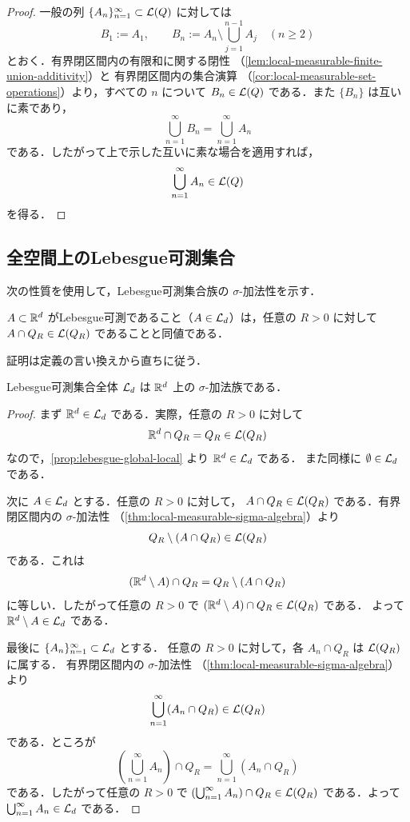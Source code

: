 \begin{proof}
一般の列 $\{A_n\}_{n=1}^{\infty}\subset\mathcal L(Q)$ に対しては
\[
B_1:=A_1,\qquad
B_n:=A_n\setminus\bigcup_{j=1}^{n-1}A_j
\quad(n\ge2)
\]
とおく．有界閉区間内の有限和に関する閉性
（\cref{lem:local-measurable-finite-union-additivity}）と
有界閉区間内の集合演算
（\cref{cor:local-measurable-set-operations}）より，すべての $n$ について
$B_n\in\mathcal L(Q)$ である．また $\{B_n\}$ は互いに素であり，
\[
\bigcup_{n=1}^{\infty}B_n=\bigcup_{n=1}^{\infty}A_n
\]
である．したがって上で示した互いに素な場合を適用すれば，
\[
\bigcup_{n=1}^{\infty}A_n\in\mathcal L(Q)
\]
を得る．
\end{proof}

\subsection{全空間上のLebesgue可測集合}

次の性質を使用して，Lebesgue可測集合族の $\sigma$-加法性を示す．
\begin{proposition} \label{prop:lebesgue-global-local}
$A\subset\mathbb R^d$ がLebesgue可測であること（$A \in \mathcal L_d$）は，任意の $R>0$ に対して $A\cap Q_R\in\mathcal L(Q_R)$ であることと同値である．    
\end{proposition}
証明は定義の言い換えから直ちに従う．

\begin{theorem}\label{thm:lebesgue-measurable-sigma-algebra}
Lebesgue可測集合全体 $\mathcal L_d$ は $\mathbb R^d$ 上の $\sigma$-加法族である．
\end{theorem}
\begin{proof}
まず $\mathbb R^d\in\mathcal L_d$ である．実際，任意の $R>0$ に対して
\[
\mathbb R^d\cap Q_R=Q_R \in \mathcal L(Q_R)
\]
なので，\cref{prop:lebesgue-global-local} より $\mathbb R^d \in \mathcal L_d$ である．
また同様に $\emptyset\in\mathcal L_d$ である．

次に $A\in\mathcal L_d$ とする．任意の $R>0$ に対して，
$A\cap Q_R\in\mathcal L(Q_R)$ である．有界閉区間内の $\sigma$-加法性
（\cref{thm:local-measurable-sigma-algebra}）より
\[
Q_R\setminus(A\cap Q_R)\in\mathcal L(Q_R)
\]
である．これは
\[
(\mathbb R^d\setminus A)\cap Q_R
=
Q_R\setminus(A\cap Q_R)
\]
に等しい．したがって任意の $R>0$ で $(\mathbb R^d \setminus A) \cap Q_R \in \mathcal L(Q_R)$ である．
よって $\mathbb R^d\setminus A\in\mathcal L_d$ である．

最後に $\{A_n\}_{n=1}^{\infty}\subset\mathcal L_d$ とする．
任意の $R>0$ に対して，各 $A_n\cap Q_R$ は $\mathcal L(Q_R)$ に属する．
有界閉区間内の $\sigma$-加法性
（\cref{thm:local-measurable-sigma-algebra}）より
\[
\bigcup_{n=1}^{\infty}(A_n\cap Q_R)\in\mathcal L(Q_R)
\]
である．ところが
\[
\left(\bigcup_{n=1}^{\infty}A_n\right)\cap Q_R
=
\bigcup_{n=1}^{\infty}(A_n\cap Q_R)
\]
である．したがって任意の $R>0$ で $\left(\bigcup_{n=1}^{\infty}A_n\right)\cap Q_R \in \mathcal L(Q_R)$ である．よって
$\bigcup_{n=1}^{\infty}A_n\in\mathcal L_d$
である．
\end{proof}

